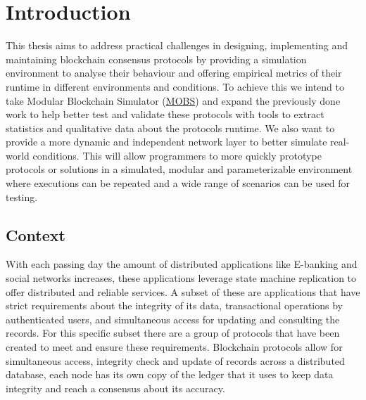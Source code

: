 
%

\chapter{Introduction}\label{cha:introduction}

This thesis aims to address practical challenges in designing, implementing and maintaining blockchain consensus
protocols by providing a simulation environment to analyse their behaviour and offering empirical metrics of their runtime in
different environments and conditions. To achieve this we intend to take Modular Blockchain Simulator (\href{https://github.com/mce-alves/MOBS
}{MOBS}) and expand the previously done work to help better test and validate these protocols with tools to extract statistics and 
qualitative data about the protocols runtime. We also want to provide a more dynamic and independent network layer
to better simulate real-world conditions. This will allow programmers to more quickly prototype protocols or solutions
in a simulated, modular and parameterizable environment where executions can be repeated and a wide range of scenarios
can be used for testing.


\section{Context}\label{sub:context}
With each passing day the amount of distributed applications like E-banking and social networks increases, these applications
leverage state machine replication to offer distributed and reliable services. A subset of these are applications
that have strict requirements about the integrity of its data, transactional operations by authenticated users, 
and simultaneous access for updating and
consulting the records. For this specific subset there are a group of protocols that have been created to meet and ensure
these requirements. Blockchain protocols allow for simultaneous access, integrity check and update of records across
a distributed database, each node has its own copy of the ledger that it uses to keep data integrity and reach a consensus
about its accuracy.


